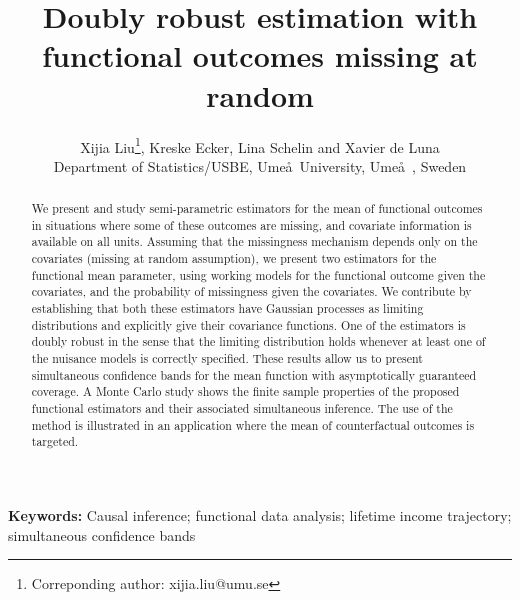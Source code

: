 \documentclass[12pt, A4]{article}
\title{Doubly robust estimation with functional outcomes missing at random}
\author{Xijia Liu\footnote{Correponding author: xijia.liu@umu.se}, Kreske Ecker, Lina Schelin and Xavier de Luna \\Department of Statistics/USBE, Ume\aa\ University, Ume\aa\ , Sweden}
\date{}
\begin{document}
\maketitle
\begin{abstract}
    We present and study semi-parametric estimators for the mean of functional outcomes in situations where some of these outcomes are missing, and covariate information is available on all units. 
    Assuming that the missingness mechanism depends only on the covariates (missing at random assumption), we present two estimators for the functional mean parameter, using working models for the functional outcome given the covariates, and the probability of missingness given the covariates. 
    We contribute by establishing that both these estimators have Gaussian processes as limiting distributions and explicitly give their covariance functions. 
    One of the estimators is doubly robust in the sense that the limiting distribution holds whenever at least one of the nuisance models is correctly specified. 
    These results allow us to present simultaneous confidence bands for the mean function with asymptotically guaranteed coverage. 
    A Monte Carlo study shows the finite sample properties of the proposed functional estimators and their associated simultaneous inference. 
    The use of the method is illustrated in an application where the mean of counterfactual outcomes is targeted.
\end{abstract}
\textbf{Keywords:}
    Causal inference;
    functional data analysis;
    lifetime income trajectory;
    simultaneous confidence bands
\end{document}
